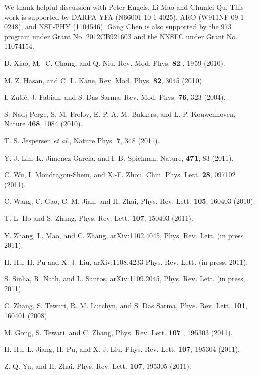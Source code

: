 \documentclass[prl,twocolumn,superscriptaddress,showpacs,floatfix]{revtex4}
\begin{document}
We thank helpful discussion with Peter Engels, Li Mao and Chunlei Qu. This
work is supported by DARPA-YFA (N66001-10-1-4025), ARO (W911NF-09-1-0248),
and NSF-PHY (1104546). Gang Chen is also supported by the 973 program under
Grant No. 2012CB921603 and the NNSFC under Grant No. 11074154.

\begin{thebibliography}{99}
 D. Xiao, M. -C. Chang, and Q. Niu, Rev. Mod. Phys. \textbf{82}%
, 1959 (2010).

 M. Z. Hasan, and C. L. Kane, Rev. Mod. Phys. \textbf{82},
3045 (2010).

 I. \u{Z}uti\'{c}, J. Fabian, and S. Das Sarma, Rev. Mod.
Phys. \textbf{76}, 323 (2004).

 S. Nadj-Perge, S. M. Frolov, E. P. A. M. Bakkers, and L.
P. Kouwenhoven, Nature \textbf{468}, 1084 (2010).

 T. S. Jespersen \textit{et al.}, Nature Phys. \textbf{7},
348 (2011).

 Y. J. Lin, K. Jimenez-Garcia, and I. B. Spielman, Nature,
\textbf{471}, 83 (2011).

 C. Wu, I. Mondragon-Shem, and X.-F. Zhou, Chin. Phys. Lett.
\textbf{28}, 097102 (2011).

 C. Wang, C. Gao, C.-M. Jian, and H. Zhai, Phys. Rev. Lett.
\textbf{105}, 160403 (2010).

 T.-L. Ho and S. Zhang, Phys. Rev. Lett. \textbf{107}, 150403
(2011).

 Y. Zhang, L. Mao, and C. Zhang, arXiv:1102.4045, Phys.
Rev. Lett. (in press 2011).

 H. Hu, H. Pu and X.-J. Liu, arXiv:1108.4233 Phys. Rev. Lett.
(in press, 2011).

 S. Sinha, R. Nath, and L. Santos, arXiv:1109.2045, Phys.
Rev. Lett. (in press, 2011).

 C. Zhang, S. Tewari, R. M. Lutchyn, and S. Das Sarma, Phys.
Rev. Lett. \textbf{101}, 160401 (2008).

 M. Gong, S. Tewari, and C. Zhang, Phys. Rev. Lett. \textbf{107%
}, 195303 (2011).

 H. Hu, L. Jiang, H. Pu, and X.-J. Liu, Phys. Rev. Lett.
\textbf{107}, 195304 (2011).

 Z.-Q. Yu, and H. Zhai, Phys. Rev. Lett. \textbf{107}, 195305
(2011).


\end{thebibliography}
\end{document}
